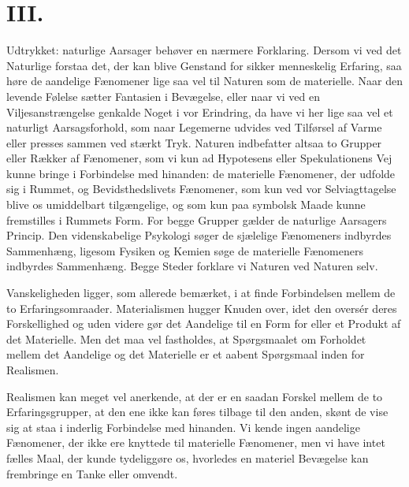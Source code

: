 \documentclass[12pt,a4paper]{article}
\begin{document}
\section*{III.}

Udtrykket: naturlige Aarsager behøver en nærmere Forklaring. Dersom vi
ved det Naturlige forstaa det, der kan blive Genstand for sikker
menneskelig Erfaring, saa høre de aandelige Fænomener lige saa vel til
Naturen som de materielle. Naar den levende Følelse sætter Fantasien i
Bevægelse, eller naar vi ved en Viljesanstrængelse genkalde Noget i vor
Erindring, da have vi her lige saa vel et naturligt Aarsagsforhold, som
naar Legemerne udvides ved Tilførsel af Varme eller presses sammen ved
stærkt Tryk. Naturen indbefatter altsaa to Grupper eller Rækker af
Fænomener, som vi kun ad Hypotesens eller Spekulationens Vej kunne
bringe i Forbindelse med hinanden: de materielle Fænomener, der udfolde
sig i Rummet, og Bevidsthedslivets Fænomener, som kun ved vor
Selviagttagelse blive os umiddelbart tilgængelige, og som kun paa
symbolsk Maade kunne fremstilles i Rummets Form. For begge Grupper
gælder de naturlige Aarsagers Princip. Den videnskabelige Psykologi
søger de sjælelige Fænomeners indbyrdes Sammenhæng, ligesom Fysiken og
Kemien søge de materielle Fænomeners indbyrdes Sammenhæng. Begge Steder
forklare vi Naturen ved Naturen selv.

Vanskeligheden ligger, som allerede bemærket, i at finde Forbindelsen
mellem de to Erfaringsomraader. Materialismen hugger Knuden over, idet
den oversér deres Forskellighed og uden videre gør det Aandelige til en
Form for eller et Produkt af det Materielle. Men det maa vel fastholdes,
at Spørgsmaalet om Forholdet mellem det Aandelige og det Materielle er
et aabent Spørgsmaal inden for Realismen.

Realismen kan meget vel anerkende, at der er en saadan Forskel mellem
de to Erfaringsgrupper, at den ene ikke kan føres tilbage til den anden,
skønt de vise sig at staa i inderlig Forbindelse med hinanden. Vi kende
ingen aandelige Fænomener, der ikke ere knyttede til materielle
Fænomener, men vi have intet fælles Maal, der kunde tydeliggøre os,
hvorledes en materiel Bevægelse kan frembringe en Tanke eller omvendt.
\end{document}
